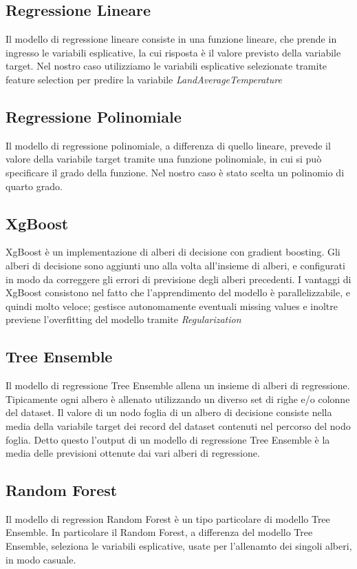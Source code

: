\documentclass[10pt, a4paper, twocolumn]{article} %
\begin{document}
\subsection{Regressione Lineare}
Il modello di regressione lineare consiste in una funzione lineare, che prende in ingresso le variabili esplicative, la cui risposta è il valore previsto della variabile target. Nel nostro caso utilizziamo le variabili esplicative selezionate tramite feature selection per predire la variabile \textit{LandAverageTemperature}
\subsection{Regressione Polinomiale}
Il modello di regressione polinomiale, a differenza di quello lineare, prevede il valore della variabile target tramite una funzione polinomiale, in cui si può specificare il grado della funzione. Nel nostro caso è stato scelta un polinomio di quarto grado.
\subsection{XgBoost}
XgBoost è un implementazione di alberi di decisione con gradient boosting. Gli alberi di decisione sono aggiunti uno alla volta all'insieme di alberi, e configurati in modo da correggere gli errori di previsione degli alberi precedenti. I vantaggi di XgBoost consistono nel fatto che l'apprendimento del modello è parallelizzabile, e quindi molto veloce; gestisce autonomamente eventuali missing values e inoltre previene l'overfitting del modello tramite \textit{Regularization}
\subsection{Tree Ensemble}
Il modello di regressione Tree Ensemble allena un insieme di alberi di regressione. Tipicamente ogni albero è allenato utilizzando un diverso set di righe e/o colonne del dataset. Il valore di un nodo foglia di un albero di decisione consiste nella media della variabile target dei record del dataset contenuti nel percorso del nodo foglia. Detto questo l'output di un modello di regressione Tree Ensemble è la media delle previsioni ottenute dai vari alberi di regressione.
\subsection{Random Forest}
Il modello di regression Random Forest è un tipo particolare di modello Tree Ensemble. In particolare il Random Forest, a differenza del modello Tree Ensemble, seleziona le variabili esplicative, usate per l'allenamto dei singoli alberi, in modo casuale.
\end{document}
